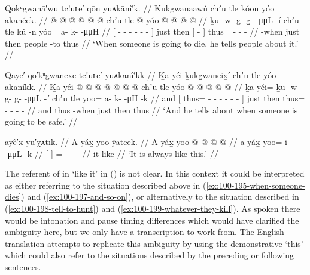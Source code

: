 \ex\label{ex:100-195-when-someone-dies}%
%
\begingl
	\glpreamble	Qokᵘgwanā′wu tc!uʟe′ qōn yuᴀkānî′k. //
	\glpreamble	Ḵukg̱wanaawú chʼu tle ḵóon yóo akanéek. //
	\gla	{}  @ {} @ {} @ {} @ {} @ {} @ {} {}
		chʼu tle 
		{}  @ {} {} 
		yóo @  @ {} @ {} @ {} //
	\glb	{} ḵu- w- g- g̱-  -μμL -í {} 
		chʼu tle
		{} ḵú -n {} 
		yóo= a- k-  -μμH //
	\glc	{}[ - - - -  - - {}]
		just then
		{}[  - {}]
		thus= - -  - //
	\gld	{}  {} {} {} {} {} -when {}
		just then
		{} people -to {}
		thus  {} {} {} //
	\glft	‘When someone is going to die, he tells people about it.’
		//
\endgl
\xe

\ex\label{ex:100-196-when-someone-is-safe}%
%
\begingl
	\glpreamble	Qaye′ qō′kᵘgwanēxe tc!uʟe′ yuᴀkanî′kk //
	\glpreamble	Ḵa yéi ḵukg̱waneix̱í chʼu tle yóo akaníkk. //
	\gla	Ḵa {} yéi @  @ {} @ {} @ {} @ {} @ {} @ {} {}
		chʼu tle yóo @  @ {} @ {} @ {} @ {} //
	\glb	ḵa {} yéi= ḵu- w- g- g̱-  -μμL -í {}
		chʼu tle yoo= a- k-  -μH -k //
	\glc	and {}[ thus= - - - -  - - {}]
		just then thus= - -  - - //
	\gld	and {} thus  {} {} {} {} {} -when {}
		just then thus  {} {} {} {}  //
	\glft	‘And he tells about when someone is going to be safe.’
		//
\endgl
\xe

\ex\label{ex:100-197-and-so-on}%
%
\begingl
	\glpreamble	ayê′x yū′ỵᴀtīk. //
	\glpreamble	A yáx̱ yoo ÿateek. //
	\gla	{} A yáx̱ {}
		yoo @  @ {} @ {} @ {} //
	\glb	{} a yáx̱ {} 
		yoo= i-  -μμL -k //
	\glc	{}[   {}]
		= -  - - //
	\gld	{} it like {}
		  {} {} {} //
	\glft	‘It is always like this.’
		//
\endgl
\xe

The referent of  in  ‘like it’ in (\lastx) is not clear.
In this context it could be interpreted as either referring to the situation described above in (\ref{ex:100-195-when-someone-dies}) and (\ref{ex:100-197-and-so-on}), or alternatively to the situation described in (\ref{ex:100-198-tell-to-hunt}) and (\ref{ex:100-199-whatever-they-kill}).
As spoken there would be intonation and pause timing differences which would have clarified the ambiguity here, but we only have a transcription to work from.
The English translation attempts to replicate this ambiguity by using the demonstrative ‘this’ which could also refer to the situations described by the preceding or following sentences.

